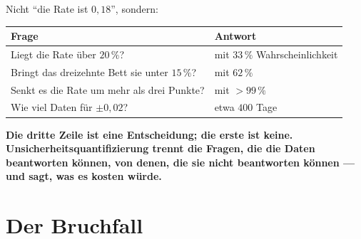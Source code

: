 \begin{merksatz}
Nicht \enquote{die Rate ist $0{,}18$}, sondern:

\begin{center}
{\small
\renewcommand{\arraystretch}{1.5}
\begin{tabular}{@{}P{5.6cm}P{2.4cm}@{}}
\toprule
\textbf{Frage} & \textbf{Antwort}\\
\midrule
Liegt die Rate über $20\,\%$? & mit $33\,\%$ Wahrscheinlichkeit\\
Bringt das dreizehnte Bett sie unter $15\,\%$? & mit $62\,\%$\\
Senkt es die Rate um mehr als drei Punkte? & mit $> 99\,\%$\\
Wie viel Daten für $\pm0{,}02$? & etwa $400$ Tage\\
\bottomrule
\end{tabular}}
\end{center}

\begin{center}
\begin{minipage}{0.9\textwidth}
\textbf{Die dritte Zeile ist eine Entscheidung; die erste ist keine. Unsicherheitsquantifizierung trennt die Fragen, die die Daten beantworten können, von denen, die sie nicht beantworten können --- und sagt, was es kosten würde.}
\end{minipage}
\end{center}

\begin{center}
\begin{minipage}{0.88\textwidth}
\end{minipage}
\end{center}
\end{merksatz}

\section{Der Bruchfall}


